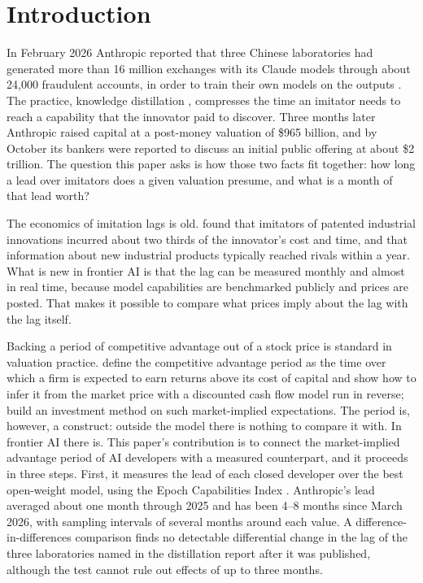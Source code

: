 \documentclass[12pt]{article}
\begin{document}
\newpage

\section{Introduction}

In February 2026 Anthropic reported that three Chinese laboratories had generated more than 16 million exchanges with its Claude models through about 24,000 fraudulent accounts, in order to train their own models on the outputs \citep{anthropic2026distill}. The practice, knowledge distillation \citep{hinton2015distilling}, compresses the time an imitator needs to reach a capability that the innovator paid to discover. Three months later Anthropic raised capital at a post-money valuation of \$965 billion, and by October its bankers were reported to discuss an initial public offering at about \$2 trillion. The question this paper asks is how those two facts fit together: how long a lead over imitators does a given valuation presume, and what is a month of that lead worth?

The economics of imitation lags is old. \citet{mansfield1981imitation} found that imitators of patented industrial innovations incurred about two thirds of the innovator's cost and time, and \citet{mansfield1985leak} that information about new industrial products typically reached rivals within a year. What is new in frontier AI is that the lag can be measured monthly and almost in real time, because model capabilities are benchmarked publicly and prices are posted. That makes it possible to compare what prices imply about the lag with the lag itself.

Backing a period of competitive advantage out of a stock price is standard in valuation practice. \citet{mauboussin1997cap} define the competitive advantage period as the time over which a firm is expected to earn returns above its cost of capital and show how to infer it from the market price with a discounted cash flow model run in reverse; \citet{rappaport2001expectations} build an investment method on such market-implied expectations. The period is, however, a construct: outside the model there is nothing to compare it with. In frontier AI there is. This paper's contribution is to connect the market-implied advantage period of AI developers with a measured counterpart, and it proceeds in three steps. First, it measures the lead of each closed developer over the best open-weight model, using the Epoch Capabilities Index \citep{epoch2026benchmarks}. Anthropic's lead averaged about one month through 2025 and has been 4--8 months since March 2026, with sampling intervals of several months around each value. A difference-in-differences comparison finds no detectable differential change in the lag of the three laboratories named in the distillation report after it was published, although the test cannot rule out effects of up to three months.
\end{document}
